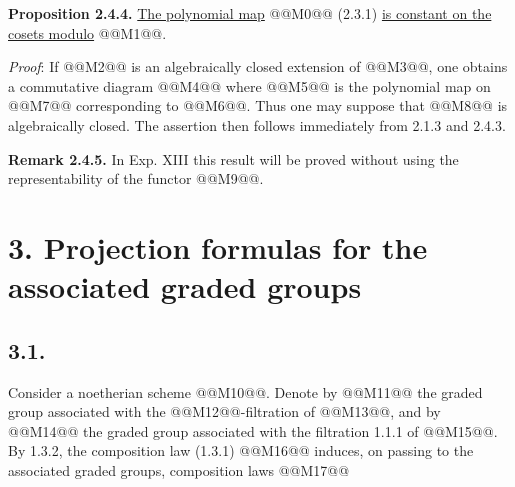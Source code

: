
\textbf{Proposition 2.4.4.} \uline{The polynomial map} @@M0@@ (2.3.1) \uline{is constant on the cosets modulo} @@M1@@.

\emph{Proof}: If @@M2@@ is an algebraically closed extension of @@M3@@, one obtains a commutative diagram
@@M4@@
where @@M5@@ is the polynomial map on @@M7@@ corresponding to @@M6@@. Thus one may suppose that @@M8@@ is algebraically closed. The assertion then follows immediately from 2.1.3 and 2.4.3.

\textbf{Remark 2.4.5.} In Exp. XIII this result will be proved without using the representability of the functor @@M9@@.

\section*{3. Projection formulas for the associated graded groups}

\subsection*{3.1.}
Consider a noetherian scheme @@M10@@. Denote by @@M11@@ the graded group associated with the @@M12@@-filtration of @@M13@@, and by @@M14@@ the graded group associated with the filtration 1.1.1 of @@M15@@. By 1.3.2, the composition law (1.3.1)
@@M16@@
induces, on passing to the associated graded groups, composition laws
@@M17@@


